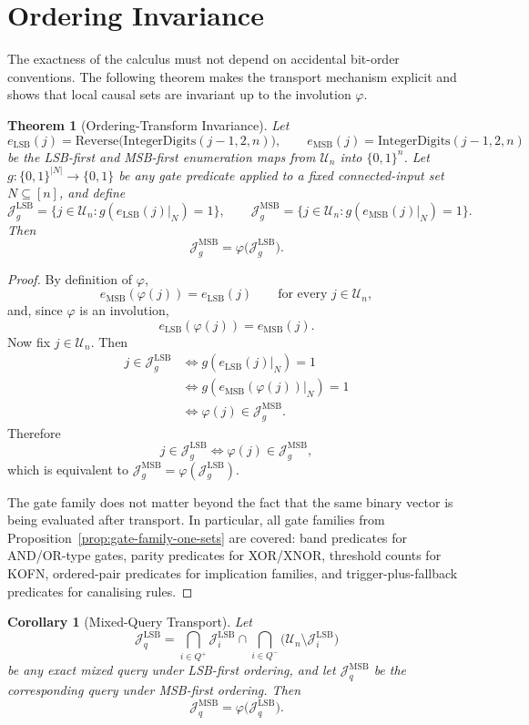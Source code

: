 \documentclass[11pt]{article}
\newtheorem{theorem}{Theorem}
\newtheorem{corollary}{Corollary}
\theoremstyle{definition}
\newcommand{\U}{\mathcal{U}_n}
\newcommand{\J}{\mathcal{J}}
\newcommand{\bits}{\{0,1\}}
\begin{document}
\section{Ordering Invariance}
The exactness of the calculus must not depend on accidental bit-order conventions. The following theorem makes the transport mechanism explicit and shows that local causal sets are invariant up to the involution \(\varphi\).

\begin{theorem}[Ordering-Transform Invariance]\label{thm:ordering-invariance}
Let
\[
e_{\mathrm{LSB}}(j)=\mathrm{Reverse}\bigl(\mathrm{IntegerDigits}(j-1,2,n)\bigr),
\qquad
e_{\mathrm{MSB}}(j)=\mathrm{IntegerDigits}(j-1,2,n)
\]
be the LSB-first and MSB-first enumeration maps from \(\U\) into \(\bits^n\). Let \(g:\bits^{|N|}\to\bits\) be any gate predicate applied to a fixed connected-input set \(N\subseteq [n]\), and define
\[
\J_g^{\mathrm{LSB}}=\{j\in\U:g(e_{\mathrm{LSB}}(j)|_N)=1\},
\qquad
\J_g^{\mathrm{MSB}}=\{j\in\U:g(e_{\mathrm{MSB}}(j)|_N)=1\}.
\]
Then
\[
\J_g^{\mathrm{MSB}}=\varphi\bigl(\J_g^{\mathrm{LSB}}\bigr).
\]
\end{theorem}

\begin{proof}
By definition of \(\varphi\),
\[
e_{\mathrm{MSB}}(\varphi(j))=e_{\mathrm{LSB}}(j)
\qquad\text{for every } j\in\U,
\]
and, since \(\varphi\) is an involution,
\[
e_{\mathrm{LSB}}(\varphi(j))=e_{\mathrm{MSB}}(j).
\]
Now fix \(j\in\U\). Then
\[
\begin{aligned}
j\in \J_g^{\mathrm{LSB}}
&\iff g(e_{\mathrm{LSB}}(j)|_N)=1\\
&\iff g(e_{\mathrm{MSB}}(\varphi(j))|_N)=1\\
&\iff \varphi(j)\in \J_g^{\mathrm{MSB}}.
\end{aligned}
\]
Therefore
\[
j\in\J_g^{\mathrm{LSB}}
\iff
\varphi(j)\in\J_g^{\mathrm{MSB}},
\]
which is equivalent to \(\J_g^{\mathrm{MSB}}=\varphi(\J_g^{\mathrm{LSB}})\).

The gate family does not matter beyond the fact that the same binary vector is being evaluated after transport. In particular, all gate families from Proposition~\ref{prop:gate-family-one-sets} are covered: band predicates for AND/OR-type gates, parity predicates for XOR/XNOR, threshold counts for KOFN, ordered-pair predicates for implication families, and trigger-plus-fallback predicates for canalising rules.
\end{proof}

\begin{corollary}[Mixed-Query Transport]\label{cor:ordering-invariance}
Let
\[
\J_q^{\mathrm{LSB}}
=
\bigcap_{i\in Q^+}\J_i^{\mathrm{LSB}}
\cap
\bigcap_{i\in Q^-}\bigl(\U\setminus \J_i^{\mathrm{LSB}}\bigr)
\]
be any exact mixed query under LSB-first ordering, and let \(\J_q^{\mathrm{MSB}}\) be the corresponding query under MSB-first ordering. Then
\[
\J_q^{\mathrm{MSB}}=\varphi\bigl(\J_q^{\mathrm{LSB}}\bigr).
\]
\end{corollary}
\end{document}
